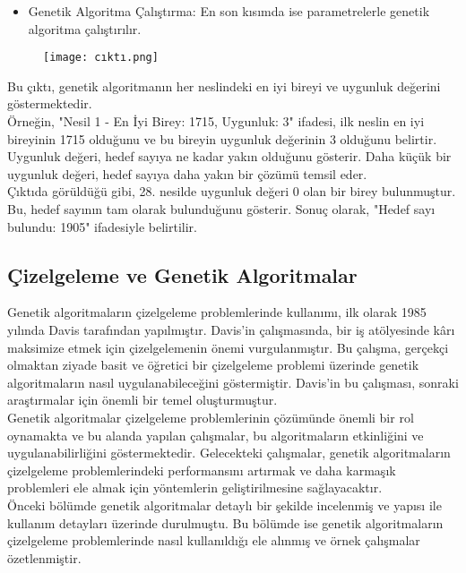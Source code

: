 \documentclass[12pt, a4paper]{article}
\begin{document}
\begin{flushleft}
\begin{itemize}
	\item Genetik Algoritma Çalıştırma: En son kısımda ise parametrelerle genetik algoritma çalıştırılır.
	
	
\end{itemize}	
\newpage

\begin{figure}[!h]
	\centering
	\texttt{[image: cıktı.png]}	 	
\end{figure}
Bu çıktı, genetik algoritmanın her neslindeki en iyi bireyi ve uygunluk değerini göstermektedir.\\
Örneğin, "Nesil 1 - En İyi Birey: 1715, Uygunluk: 3" ifadesi, ilk neslin en iyi bireyinin 1715 olduğunu ve bu bireyin uygunluk değerinin 3 olduğunu belirtir. Uygunluk değeri, hedef sayıya ne kadar yakın olduğunu gösterir. Daha küçük bir uygunluk değeri, hedef sayıya daha yakın bir çözümü temsil eder.\\
Çıktıda görüldüğü gibi, 28. nesilde uygunluk değeri 0 olan bir birey bulunmuştur. Bu, hedef sayının tam olarak bulunduğunu gösterir. Sonuç olarak, "Hedef sayı bulundu: 1905" ifadesiyle belirtilir.




\subsection{Çizelgeleme ve Genetik Algoritmalar}

Genetik algoritmaların çizelgeleme problemlerinde kullanımı, ilk olarak 1985 yılında Davis tarafından yapılmıştır. Davis'in çalışmasında, bir iş atölyesinde kârı maksimize etmek için çizelgelemenin önemi vurgulanmıştır. Bu çalışma, gerçekçi olmaktan ziyade basit ve öğretici bir çizelgeleme problemi üzerinde genetik algoritmaların nasıl uygulanabileceğini göstermiştir. Davis'in bu çalışması, sonraki araştırmalar için önemli bir temel oluşturmuştur.\\[10pt]


Genetik algoritmalar çizelgeleme problemlerinin çözümünde önemli bir rol oynamakta ve bu alanda yapılan çalışmalar, bu algoritmaların etkinliğini ve uygulanabilirliğini göstermektedir. Gelecekteki çalışmalar, genetik algoritmaların çizelgeleme problemlerindeki performansını artırmak ve daha karmaşık problemleri ele almak için yöntemlerin geliştirilmesine sağlayacaktır.\\[10pt]




Önceki bölümde genetik algoritmalar detaylı bir şekilde incelenmiş ve yapısı ile kullanım detayları üzerinde durulmuştu. Bu bölümde ise genetik algoritmaların çizelgeleme problemlerinde nasıl kullanıldığı ele alınmış ve örnek  çalışmalar özetlenmiştir.\\[10pt]



\end{flushleft}
\end{document}
